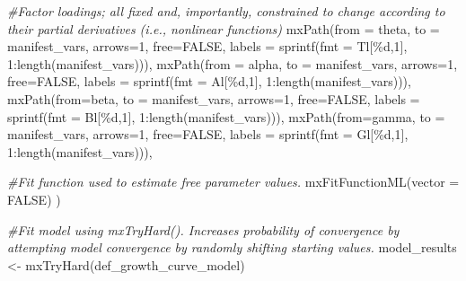 \documentclass[
12pt, %
twoside,
english]{guelphthesis}
\newenvironment{Shaded}{\begin{snugshade}}{\end{snugshade}}
\newcommand{\AttributeTok}[1]{\textcolor[rgb]{0.77,0.63,0.00}{#1}}
\newcommand{\CommentTok}[1]{\textcolor[rgb]{0.56,0.35,0.01}{\textit{#1}}}
\newcommand{\ConstantTok}[1]{\textcolor[rgb]{0.00,0.00,0.00}{#1}}
\newcommand{\DecValTok}[1]{\textcolor[rgb]{0.00,0.00,0.81}{#1}}
\newcommand{\FunctionTok}[1]{\textcolor[rgb]{0.00,0.00,0.00}{#1}}
\newcommand{\NormalTok}[1]{#1}
\newcommand{\OtherTok}[1]{\textcolor[rgb]{0.56,0.35,0.01}{#1}}
\newcommand{\SpecialCharTok}[1]{\textcolor[rgb]{0.00,0.00,0.00}{#1}}
\newcommand{\StringTok}[1]{\textcolor[rgb]{0.31,0.60,0.02}{#1}}
\begin{document}
\begin{Shaded}
\begin{Highlighting}[numbers=left,,]
  \CommentTok{\#Factor loadings; all fixed and, importantly, constrained to change according to their partial derivatives (i.e., nonlinear functions) }
  \FunctionTok{mxPath}\NormalTok{(}\AttributeTok{from =} \StringTok{\textquotesingle{}theta\textquotesingle{}}\NormalTok{, }\AttributeTok{to =}\NormalTok{ manifest\_vars, }\AttributeTok{arrows=}\DecValTok{1}\NormalTok{, }\AttributeTok{free=}\ConstantTok{FALSE}\NormalTok{,  }
         \AttributeTok{labels =} \FunctionTok{sprintf}\NormalTok{(}\AttributeTok{fmt =} \StringTok{\textquotesingle{}Tl[\%d,1]\textquotesingle{}}\NormalTok{, }\DecValTok{1}\SpecialCharTok{:}\FunctionTok{length}\NormalTok{(manifest\_vars))),}
  \FunctionTok{mxPath}\NormalTok{(}\AttributeTok{from =} \StringTok{\textquotesingle{}alpha\textquotesingle{}}\NormalTok{, }\AttributeTok{to =}\NormalTok{ manifest\_vars, }\AttributeTok{arrows=}\DecValTok{1}\NormalTok{, }\AttributeTok{free=}\ConstantTok{FALSE}\NormalTok{,  }
         \AttributeTok{labels =} \FunctionTok{sprintf}\NormalTok{(}\AttributeTok{fmt =} \StringTok{\textquotesingle{}Al[\%d,1]\textquotesingle{}}\NormalTok{, }\DecValTok{1}\SpecialCharTok{:}\FunctionTok{length}\NormalTok{(manifest\_vars))), }
  \FunctionTok{mxPath}\NormalTok{(}\AttributeTok{from=}\StringTok{\textquotesingle{}beta\textquotesingle{}}\NormalTok{, }\AttributeTok{to =}\NormalTok{ manifest\_vars, }\AttributeTok{arrows=}\DecValTok{1}\NormalTok{,  }\AttributeTok{free=}\ConstantTok{FALSE}\NormalTok{,}
         \AttributeTok{labels =}  \FunctionTok{sprintf}\NormalTok{(}\AttributeTok{fmt =} \StringTok{\textquotesingle{}Bl[\%d,1]\textquotesingle{}}\NormalTok{, }\DecValTok{1}\SpecialCharTok{:}\FunctionTok{length}\NormalTok{(manifest\_vars))), }
  \FunctionTok{mxPath}\NormalTok{(}\AttributeTok{from=}\StringTok{\textquotesingle{}gamma\textquotesingle{}}\NormalTok{, }\AttributeTok{to =}\NormalTok{ manifest\_vars, }\AttributeTok{arrows=}\DecValTok{1}\NormalTok{,  }\AttributeTok{free=}\ConstantTok{FALSE}\NormalTok{,}
         \AttributeTok{labels =}  \FunctionTok{sprintf}\NormalTok{(}\AttributeTok{fmt =} \StringTok{\textquotesingle{}Gl[\%d,1]\textquotesingle{}}\NormalTok{, }\DecValTok{1}\SpecialCharTok{:}\FunctionTok{length}\NormalTok{(manifest\_vars))), }
  
  \CommentTok{\#Fit function used to estimate free parameter values. }
  \FunctionTok{mxFitFunctionML}\NormalTok{(}\AttributeTok{vector =} \ConstantTok{FALSE}\NormalTok{)}
\NormalTok{)}

\CommentTok{\#Fit model using mxTryHard(). Increases probability of convergence by attempting model convergence by randomly shifting starting values. }
\NormalTok{model\_results }\OtherTok{\textless{}{-}} \FunctionTok{mxTryHard}\NormalTok{(def\_growth\_curve\_model)}
\end{Highlighting}
\end{Shaded}
\end{document}
